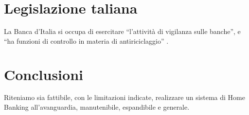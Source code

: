 \documentclass[10pt]{softeng} %
\begin{document}
\section{Legislazione taliana}

La Banca d'Italia si occupa di esercitare ``l'attivit\`a di vigilanza sulle banche'', e ``ha funzioni di controllo in materia di antiriciclaggio'' \cite[Funzioni]{banca_italia}.

\section{Conclusioni}

Riteniamo sia fattibile, con le limitazioni indicate, realizzare un sistema di Home Banking all'avanguardia, manutenibile, espandibile e generale.



\end{document}
